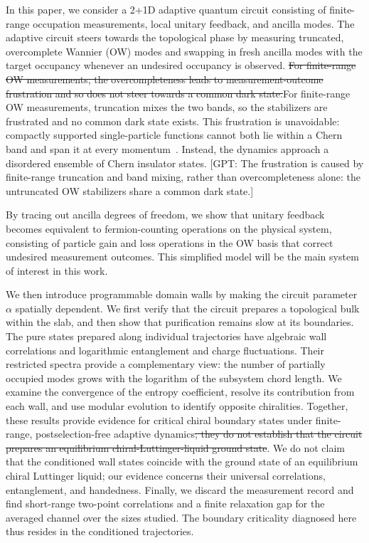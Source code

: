 \documentclass[aps,prb,10pt,twocolumn,superscriptaddress,longbibliography,floatfix]{revtex4-2}
\newcommand{\GPT}[1]{{\color{magenta}[GPT: #1]}}
\newcommand{\claudeadd}[1]{{\color{orange}#1}}
\newcommand{\claudedel}[1]{{\color{orange}\sout{#1}}}
\begin{document}
In this paper, we consider a 2+1D adaptive quantum circuit consisting of finite-range occupation measurements, local unitary feedback, and ancilla modes. The adaptive circuit steers towards the topological phase by measuring truncated, overcomplete Wannier (OW) modes and swapping in fresh ancilla modes with the target occupancy whenever an undesired occupancy is observed. \claudedel{For finite-range OW measurements, the overcompleteness leads to measurement-outcome frustration and so does not steer towards a common dark state.}\claudeadd{For finite-range OW measurements, truncation mixes the two bands, so the stabilizers are frustrated and no common dark state exists. This frustration is unavoidable: compactly supported single-particle functions cannot both lie within a Chern band and span it at every momentum~\cite{DubailRead2015}.} Instead, the dynamics approach a disordered ensemble of Chern insulator states.
\GPT{The frustration is caused by finite-range truncation and band mixing, rather than overcompleteness alone: the untruncated OW stabilizers share a common dark state.}
 
By tracing out ancilla degrees of freedom, we show that unitary feedback becomes equivalent to fermion-counting operations on the physical system, consisting of particle gain and loss operations in the OW basis that correct undesired measurement outcomes. This simplified model will be the main system of interest in this work.

{\color{blue}
We then introduce programmable domain walls by making the circuit parameter $\alpha$ spatially dependent. We first verify that the circuit prepares a topological bulk within the slab, and then show that purification remains slow at its boundaries. The pure states prepared along individual trajectories have algebraic wall correlations and logarithmic entanglement and charge fluctuations. Their restricted spectra provide a complementary view: the number of partially occupied modes grows with the logarithm of the subsystem chord length. We examine the convergence of the entropy coefficient, resolve its contribution from each wall, and use modular evolution to identify opposite chiralities. Together, these results provide evidence for critical chiral boundary states under finite-range, postselection-free adaptive dynamics\claudedel{; they do not establish that the circuit prepares an equilibrium chiral-Luttinger-liquid ground state}\claudeadd{. We do not claim that the conditioned wall states coincide with the ground state of an equilibrium chiral Luttinger liquid; our evidence concerns their universal correlations, entanglement, and handedness.} Finally, we discard the measurement record and find short-range two-point correlations and a finite relaxation gap for the averaged channel over the sizes studied. The boundary criticality diagnosed here thus resides in the conditioned trajectories.
}
\end{document}
